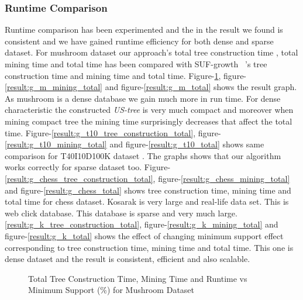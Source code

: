     \subsubsection{Runtime Comparison}
    Runtime comparison has been experimented and the in the result we found is consistent and we have gained runtime efficiency for both dense and sparse dataset. For mushroom dataset our approach's total tree construction time , total mining time and total time has been compared with SUF-growth ~\cite{suf_growth}'s tree construction time and mining time and total time. Figure-\ref{result:g_m_tree_construction_total}, figure-\ref{result:g_m_mining_total} and figure-\ref{result:g_m_total} shows the result graph. As mushroom is a dense database we gain much more in run time. For dense characteristic the constructed \emph{US-tree} is very much compact and moreover when mining compact tree the mining time surprisingly decreases that affect the total time. Figure-\ref{result:g_t10_tree_construction_total}, figure-\ref{result:g_t10_mining_total} and figure-\ref{result:g_t10_total} shows same comparison for T40I10D100K dataset . The graphs shows that our algorithm works correctly for sparse dataset too. Figure-\ref{result:g_chess_tree_construction_total}, figure-\ref{result:g_chess_mining_total} and figure-\ref{result:g_chess_total} shows tree construction time, mining time and total time for chess dataset. Kosarak is very large and real-life data set. This is web click database. This database is sparse and very much large. \ref{result:g_k_tree_construction_total}, figure-\ref{result:g_k_mining_total} and figure-\ref{result:g_k_total} shows the effect of changing minimum support effect corresponding to tree construction time, mining time and total time. This one is dense dataset and the result is consistent, efficient and also scalable.
            \begin{figure}[h]
            \centering
                
                
                
            \caption{Total Tree Construction Time, Mining Time and Runtime vs Minimum Support (\%) for Mushroom Dataset }
            \label{result:g_m_tree_construction_total}
            \end{figure}
            
